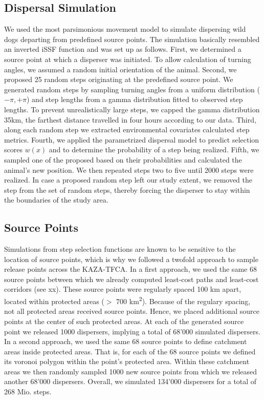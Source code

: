 \documentclass[abstract=on,10pt,a4paper,bibliography=totocnumbered]{article}
\begin{document}
\subsection{Dispersal Simulation}
We used the most parsimonious movement model to simulate dispersing wild dogs
departing from predefined source points. The simulation basically resembled an
inverted iSSF function and was set up as follows. First, we determined a source
point at which a disperser was initiated. To allow calculation of turning
angles, we assumed a random initial orientation of the animal. Second, we
proposed 25 random steps originating at the predefined source point. We
generated random steps by sampling turning angles from a uniform distribution
(\(-\pi, +\pi\)) and step lengths from a gamma distribution fitted to observed
step lengths. To prevent unrealistically large steps, we capped the gamma
distribution 35km, the farthest distance travelled in four hours according to
our data. Third, along each random step we extracted environmental covariates
calculated step metrics. Fourth, we applied the parametrized dispersal model to
predict selection scores \(w(x)\) and to determine the probability of a step
being realized. Fifth, we sampled one of the proposed based on their
probabilities and calculated the animal's new position. We then repeated steps
two to five until 2000 steps were realized. In case a proposed random step left
our study extent, we removed the step from the set of random steps, thereby
forcing the disperser to stay within the boundaries of the study area.

\subsection{Source Points}
Simulations from step selection functions are known to be sensitive to the
location of source points, which is why we followed a twofold approach to sample
release points across the KAZA-TFCA. In a first approach, we used the same 68
source points between which we already computed least-cost paths and least-cost
corridors (see xx). These source points were regularly spaced 100 km apart,
located within protected areas (\(>\) 700 km\textsuperscript{2}). Because of
the regulary spacing, not all protected areas received source points. Hence, we
placed additional source points at the center of such protected areas. At each
of the generated source point we released 1000 dispersers, implying a total of
68'000 simulated dispersers. In a second approach, we used the same 68 source
points to define catchment areas inside protected areas. That is, for each of
the 68 source points we defined its voronoi polygon within the point's protected
area. Within these catchment areas we then randomly sampled 1000 new source
points from which we released another 68'000 dispersers. Overall, we simulated
134'000 dispersers for a total of 268 Mio. steps.
\end{document}
